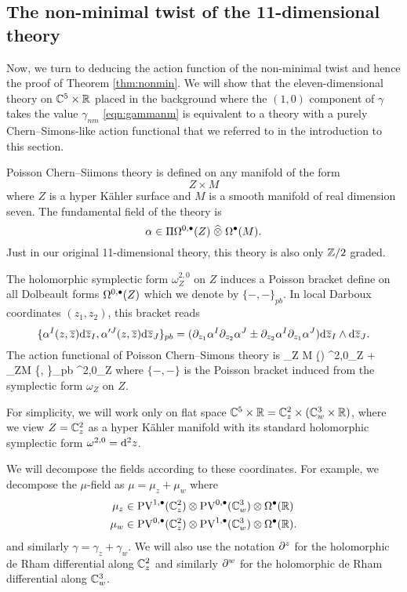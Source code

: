 \subsection{The non-minimal twist of the 11-dimensional theory}

Now, we turn to deducing the action function of the non-minimal twist and hence the proof of Theorem \ref{thm:nonmin}. 
We will show that the eleven-dimensional theory on $\mathbb C^5 \times \mathbb R$ placed in the background where the $(1,0)$ component of $\gamma$ takes the value $\gamma_{nm}$ \eqref{eqn:gammanm} is equivalent to a theory with a purely Chern--Simons-like action functional that we referred to in the introduction to this section. 

Poisson Chern--Siimons theory is defined on any manifold of the form
\[
Z \times M
\]
where $Z$ is a hyper K\"ahler surface and $M$ is a smooth manifold of real dimension seven. 
The fundamental field of the theory is  
\[
\alpha \in \Pi \Omega^{0,\bullet}(Z) \; \widehat{\otimes} \; \Omega^\bullet(M)  .
\]
Just in our original 11-dimensional theory, this theory is also only $\mathbb Z/2$ graded. 

The holomorphic symplectic form $\omega_Z^{2,0}$ on $Z$ induces a Poisson bracket define on all Dolbeault forms $\Omega^{0,\bullet}(Z)$ which we denote by $\{-,-\}_{pb}$. 
In local Darboux coordinates $(z_1,z_2)$, this bracket reads
\[
\{\alpha^I (z,\overline{z}) {\rm d} \overline{z}_I , \alpha'^J (z,\overline{z}) {\rm d} \overline{z}_J\}_{pb} = (\partial_{z_1} \alpha^I \partial_{z_2} \alpha^J \pm \partial_{z_2} \alpha^I \partial_{z_1} \alpha^J) {\rm d} \overline{z}_I \wedge {\rm d} \overline{z}_J . 
\]
The action functional of Poisson Chern--Simons theory is 
\beqn\label{eqn:pcsaction}
     \int_{Z \times M} (\alpha \wedge \d\alpha) \wedge \omega^{2,0}_Z  +  \int_{Z\times M} \alpha \wedge \{\alpha, \alpha\}_{pb} \wedge \omega^{2,0}_Z
\eeqn
where $\{-,-\}$ is the Poisson bracket induced from the symplectic form $\omega_Z$ on $Z$. 

For simplicity, we will work only on flat space $\mathbb C^5 \times \mathbb R = \mathbb C^2_z \times (\mathbb C^3_w \times \mathbb R)$, where we view $Z = \mathbb C^2_z$ as a hyper K\"ahler manifold with its standard holomorphic symplectic form $\omega^{2,0} = {\rm d}^2 z$.

We will decompose the fields according to these coordinates. 
For example, we decompose the $\mu$-field as $\mu = \mu_z + \mu_w$ where
\begin{align*}
\mu_z  &\in {\rm PV}^{1,\bullet}(\mathbb C^2_z) \otimes {\rm PV}^{0,\bullet}(\mathbb C^3_w) \otimes \Omega^\bullet(\mathbb R) \\
\mu_w & \in {\rm PV}^{0,\bullet}(\mathbb C^2_z) \otimes {\rm PV}^{1,\bullet}(\mathbb C^3_w) \otimes \Omega^\bullet(\mathbb R)  .
\end{align*}
and similarly $\gamma = \gamma_z + \gamma_w$. 
We will also use the notation $\partial^z$ for the holomorphic de Rham differential along $\mathbb C_z^2$ and similarly $\partial^w$ for the holomorphic de Rham differential along $\mathbb C^3_w$. 

